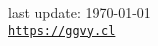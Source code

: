 \documentclass[letterpaper, 11pt]{article}
\def\footerlink{https://ggvy.cl}
\begin{document}
\bigskip

\begin{center}
 \begin{footnotesize}
   last update: \today \\
   \href{\footerlink}{\texttt{\footerlink}}
 \end{footnotesize}
\end{center}
\end{document}

